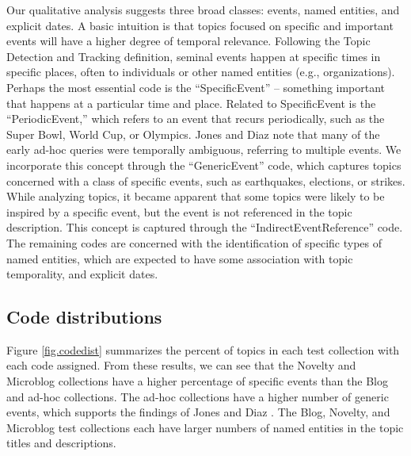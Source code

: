 \documentclass[runningheads,a4paper]{llncs}
\begin{document}
Our qualitative analysis suggests three broad classes: events, named entities, and explicit dates. A basic intuition is that topics focused on specific and important events will have a higher degree of temporal relevance. Following the Topic Detection and Tracking definition, seminal events happen at specific times in specific places, often to individuals or other named entities (e.g., organizations). Perhaps the most essential code is the ``SpecificEvent'' -- something important that happens at a particular time and place. Related to SpecificEvent is the ``PeriodicEvent,'' which refers to an event that recurs periodically, such as the Super Bowl, World Cup, or Olympics. Jones and Diaz \cite{Jones2007} note that many of the early ad-hoc queries were temporally ambiguous, referring to multiple events. We incorporate this concept through the ``GenericEvent'' code, which captures topics concerned with a class of specific events, such as earthquakes, elections, or strikes. While analyzing topics, it became apparent that some topics were likely to be inspired by a specific event, but the event is not referenced in the topic description. This concept is captured through the ``IndirectEventReference'' code. The remaining codes are concerned with the identification of specific types of named entities, which are expected to have some  association with topic temporality, and explicit dates.


\subsection{Code distributions}

Figure \ref{fig.codedist} summarizes the percent of topics in each test collection with each code assigned. From these results, we can see that the Novelty and Microblog  collections have a higher percentage of specific events than the Blog and ad-hoc collections. The ad-hoc collections have a higher number of generic events, which supports the findings of Jones and Diaz \cite{Jones2007}. The Blog, Novelty, and Microblog test collections each have larger numbers of named entities in the topic titles and descriptions.
\end{document}
